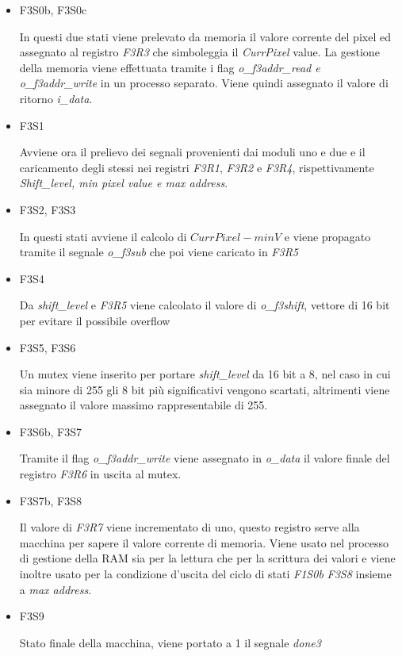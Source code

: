 \documentclass{article}
\begin{document}
\begin{enumerate}
\begin{itemize}
		\item F3S0b, F3S0c
		
		In questi due stati viene prelevato da memoria il valore corrente del pixel ed assegnato al registro \emph{F3R3} che simboleggia il \emph{CurrPixel} value. La gestione della memoria viene effettuata tramite i flag \emph{o\_f3addr\_read \emph{e} o\_f3addr\_write} in un processo separato. Viene quindi assegnato il valore di ritorno \emph{i\_data}.
		
		\item F3S1
		
		Avviene ora il prelievo dei segnali provenienti dai moduli uno e due e il caricamento degli stessi nei registri \emph{F3R1}, \emph{F3R2} e \emph{F3R4}, rispettivamente \textit{Shift\_level, min pixel value \emph{e} max address}.
		
		\item F3S2, F3S3
		
		In questi stati avviene il calcolo di \(CurrPixel - minV\) e viene propagato tramite il segnale \emph{o\_f3sub} che poi viene caricato in \emph{F3R5}
		
		\item F3S4
		
		Da \emph{shift\_level} e \emph{F3R5} viene calcolato il valore di \emph{o\_f3shift}, vettore di 16 bit per evitare il possibile overflow
		
		\item F3S5, F3S6
		
		Un mutex viene inserito per portare \emph{shift\_level} da 16 bit a 8, nel caso in cui sia minore di 255 gli 8 bit più significativi vengono scartati, altrimenti viene assegnato il valore massimo rappresentabile di 255.
		
		\item F3S6b, F3S7
		
		Tramite il flag \emph{o\_f3addr\_write} viene assegnato in \emph{o\_data} il valore finale del registro \emph{F3R6} in uscita al mutex.
		
		\item F3S7b, F3S8
		
		Il valore di \emph{F3R7} viene incrementato di uno, questo registro serve alla macchina per sapere il valore corrente di memoria. Viene usato nel processo di gestione della RAM sia per la lettura che per la scrittura dei valori e viene inoltre usato per la condizione d'uscita del ciclo di stati \emph{F1S0b} \textrightarrow  \emph{F3S8} insieme a \emph{max address}.		
		
		\item F3S9
		
		Stato finale della macchina, viene portato a 1 il segnale \emph{done3}
		
		\end {itemize}
 \end{enumerate}
\end{document}
